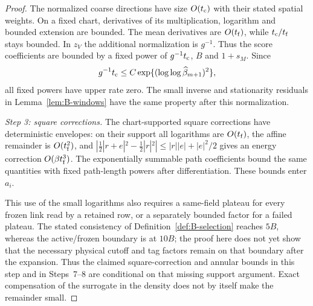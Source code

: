 \begin{proof}
The normalized coarse directions have size $O(t_{\rm c})$ with their stated spatial weights. On a fixed chart, derivatives of its multiplication, logarithm and bounded extension are bounded. The mean derivatives are $O(t_{\rm f})$, while $t_{\rm c}/t_{\rm f}$ stays bounded. In $z_V$ the additional normalization is $g^{-1}$. Thus the score coefficients are bounded by a fixed power of $g^{-1}t_{\rm c}$, $B$ and $1+s_M$. Since
\begin{equation*}
g^{-1}t_{\rm c}\le C\exp\{(\log\log\widehat{\beta}_{m+1})^2\},
\end{equation*}
all fixed powers have upper rate zero. The small inverse and stationarity residuals in Lemma~\ref{lem:B-windows} have the same property after this normalization.

\emph{Step 3: square corrections.} The chart-supported square corrections have deterministic envelopes: on their support all logarithms are $O(t_{\rm f})$, the affine remainder is $O(t_{\rm f}^2)$, and $|\tfrac12|r+e|^2-\tfrac12|r|^2|\le |r||e|+|e|^2/2$ gives an energy correction $O(\beta t_{\rm f}^3)$. The exponentially summable path coefficients bound the same quantities with fixed path-length powers after differentiation. These bounds enter $a_i$.

This use of the small logarithms also requires a same-field plateau for every frozen link read by a retained row, or a separately bounded factor for a failed plateau. The stated consistency of Definition~\ref{def:B-selection} reaches $5B$, whereas the active/frozen boundary is at $10B$; the proof here does not yet show that the necessary physical cutoff and tag factors remain on that boundary after the expansion. Thus the claimed square-correction and annular bounds in this step and in Steps~7--8 are conditional on that missing support argument. Exact compensation of the surrogate in the density does not by itself make the remainder small.


\end{proof}
